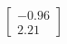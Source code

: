 \documentclass[preview]{standalone}
\begin{document}
\begin{align*}
\begin{bmatrix} -0.96 \\ 2.21 \end{bmatrix}
\end{align*}
\end{document}
